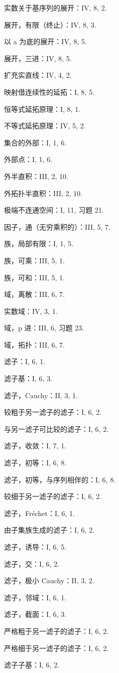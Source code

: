 实数关于基序列的展开：IV, 8, 2.

展开，有限（终止）：IV, 8, 3.

以 a 为底的展开：IV, 8, 5.

展开，三进：IV, 8, 5.

扩充实直线：IV, 4, 2.

映射借连续性的延拓：I, 8, 5.

恒等式延拓原理：I, 8, 1.

不等式延拓原理：IV, 5, 2.

集合的外部：I, 1, 6.

外部点：I, 1, 6.

外半直积：III, 2, 10.

外拓扑半直积：III, 2, 10.

极端不连通空间：I, 11, 习题 21.

因子，通（无穷乘积的）：III, 5, 7.

族，局部有限：I, 1, 5.

族，可乘：III, 5, 1.

族，可和：III, 5, 1.

域，离散：III, 6, 7.

实数域：IV, 3, 1.

域，p 进：III, 6, 习题 23.

域，拓扑：III, 6, 7.

滤子：I, 6, 1.

滤子基：I, 6, 3.

滤子，Cauchy：II, 3, 1.

较粗于另一滤子的滤子：I, 6, 2.

与另一滤子可比较的滤子：I, 6, 2.

滤子，收敛：I, 7, 1.

滤子，初等：I, 6, 8.

滤子，初等，与序列相伴的：I, 6, 8.

较细于另一滤子的滤子：I, 6, 2.

滤子，Fréchet：I, 6, 1.

由子集族生成的滤子：I, 6, 2.

滤子，诱导：I, 6, 5.

滤子，交：I, 6, 2.

滤子，极小 Cauchy：II, 3, 2.

滤子，邻域：I, 6, 1.

滤子，截面：I, 6, 3.

严格粗于另一滤子的滤子：I, 6, 2.

严格细于另一滤子的滤子：I, 6, 2.

滤子子基：I, 6, 2.


